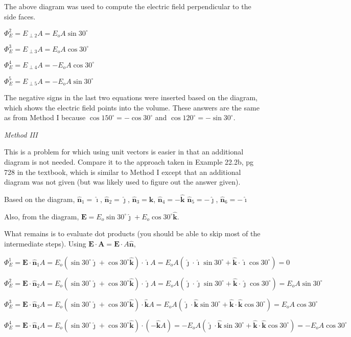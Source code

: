 \documentclass{article}
\newcommand{\ihat}[0]{\hat{\boldsymbol{\imath}}}
\newcommand{\jhat}[0]{\hat{\boldsymbol{\jmath}}}
\newcommand{\khat}[0]{\hat{\boldsymbol{k}}}
\begin{document}


The above diagram was used to compute the electric field perpendicular to the side faces.

$\Phi_E^2=E_{\perp 2}A=E_oA\sin 30^\circ$

$\Phi_E^3=E_{\perp 3}A=E_oA\cos 30^\circ$

$\Phi_E^4=E_{\perp 4}A=-E_oA\cos 30^\circ$

$\Phi_E^5=E_{\perp 5}A=-E_oA\sin 30^\circ$

The negative signs in the last two equations were inserted based on the diagram, which shows the electric field points into the volume. These answers are the same as from Method I because $\cos 150^\circ = -\cos 30^\circ$ and $\cos 120^\circ = -\sin 30^\circ$.

\emph{Method III}

This is a problem for which using unit vectors is easier in that an additional diagram is not needed. Compare it to the approach taken in Example 22.2b, pg 728 in the textbook, which is similar to Method I except that an additional diagram was not given (but was likely used to figure out the answer given).

Based on the diagram, $\hat{\mathbf{n}}_1=\ihat$, $\hat{\mathbf{n}}_2=\jhat$, $\hat{\mathbf{n}}_3=\khat$, $\hat{\mathbf{n}}_4=-\khat$
$\hat{\mathbf{n}}_5=-\jhat$, $\hat{\mathbf{n}}_6=-\ihat$

Also, from the diagram, $\mathbf{E}=E_o\sin30^\circ\jhat+E_o\cos30^\circ\khat$.

What remains is to evaluate dot products (you should be able to skip most of the intermediate steps). Using $\mathbf{E}\cdot\mathbf{A}=\mathbf{E}\cdot A\hat{\mathbf{n}}$,

$$\Phi_E^1=\mathbf{E}\cdot \hat{\mathbf{n}}_1A=E_o(\sin 30^\circ\jhat+\cos 30^\circ\khat)\cdot\ihat A = E_oA(\jhat\cdot\ihat\sin 30^\circ+\khat\cdot\ihat\cos 30^\circ)=0$$

$$\Phi_E^2=\mathbf{E}\cdot \hat{\mathbf{n}}_2A=E_o(\sin 30^\circ\jhat+\cos 30^\circ\khat)\cdot\jhat A = E_oA(\jhat\cdot\jhat\sin 30^\circ+\khat\cdot\jhat\cos 30^\circ)=E_oA\sin 30^\circ$$

$$\Phi_E^3=\mathbf{E}\cdot \hat{\mathbf{n}}_3A=E_o(\sin 30^\circ\jhat+\cos 30^\circ\khat)\cdot\khat A = E_oA(\jhat\cdot\khat\sin 30^\circ+\khat\cdot\khat\cos 30^\circ)=E_oA\cos 30^\circ$$

$$\Phi_E^4=\mathbf{E}\cdot \hat{\mathbf{n}}_4A=E_o(\sin 30^\circ\jhat+\cos 30^\circ\khat)\cdot(-\khat A) = -E_oA(\jhat\cdot\khat\sin 30^\circ+\khat\cdot\khat\cos 30^\circ)=-E_oA\cos 30^\circ$$
\end{document}
